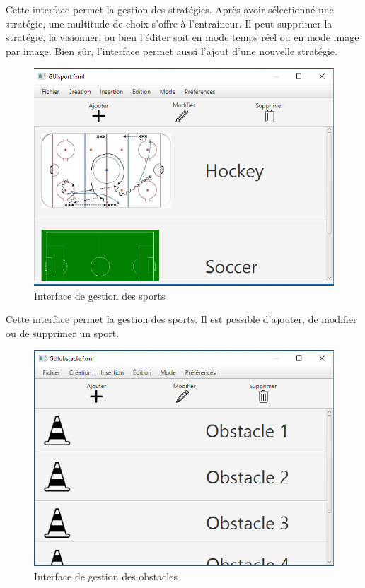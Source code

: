 Cette interface permet la gestion des stratégies.
Après avoir sélectionné une stratégie, une multitude de choix s'offre à l'entraineur. 
Il peut supprimer la stratégie, la visionner, ou bien l'éditer soit en mode temps réel ou en mode image par image. 
Bien sûr, l'interface permet aussi l'ajout d'une nouvelle stratégie.

\begin{figure}[htpb]
    \centering
    \includegraphics[scale=0.7]{fig/gui/gui_sport.png}
    \caption{Interface de gestion des sports}
    \label{fig:gui:gui_sport}
\end{figure}

Cette interface permet la gestion des sports.
Il est possible d'ajouter, de modifier ou de supprimer un sport.

\begin{figure}[htpb]
    \centering
    \includegraphics[scale=0.7]{fig/gui/gui_obstacles.png}
    \caption{Interface de gestion des obstacles}
    \label{fig:gui:gui_obstacles}
\end{figure}

